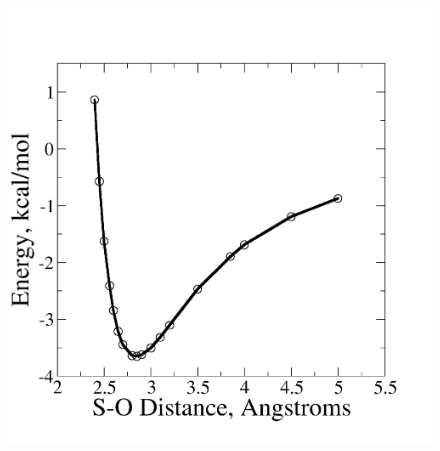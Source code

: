 \documentclass{article}
\begin{document}
\begin{figure}[h!]
	\begin{center}
		\includegraphics[scale=1.0]{interaction-energy.png}
	\end{center}
\end{figure}
\end{document}
